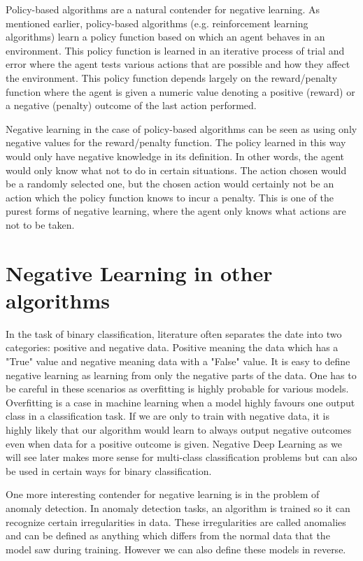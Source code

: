 \documentclass[b5paper]{book}
\begin{document}
Policy-based algorithms are a natural contender for negative learning. As mentioned earlier, policy-based algorithms (e.g. reinforcement learning algorithms) learn a policy function based on which an agent behaves in an environment. This policy function is learned in an iterative process of trial and error where the agent tests various actions that are possible and how they affect the environment. This policy function depends largely on the reward/penalty function where the agent is given a numeric value denoting a positive (reward) or a negative (penalty) outcome of the last action performed.

Negative learning in the case of policy-based algorithms can be seen as using only negative values for the reward/penalty function. The policy learned in this way would only have negative knowledge in its definition. In other words, the agent would only know what not to do in certain situations. The action chosen would be a randomly selected one, but the chosen action would certainly not be an action which the policy function knows to incur a penalty. This is one of the purest forms of negative learning, where the agent only knows what actions are not to be taken.

\section{Negative Learning in other algorithms}

In the task of binary classification, literature often separates the date into two categories: positive and negative data. Positive meaning the data which has a "True" value and negative meaning data with a "False" value. It is easy to define negative learning as learning from only the negative parts of the data. One has to be careful in these scenarios as overfitting is highly probable for various models. Overfitting is a case in machine learning when a model highly favours one output class in a classification task. If we are only to train with negative data, it is highly likely that our algorithm would learn to always output negative outcomes even when data for a positive outcome is given. Negative Deep Learning as we will see later makes more sense for multi-class classification problems but can also be used in certain ways for binary classification.

One more interesting contender for negative learning is in the problem of anomaly detection. In anomaly detection tasks, an algorithm is trained so it can recognize certain irregularities in data. These irregularities are called anomalies and can be defined as anything which differs from the normal data that the model saw during training. However we can also define these models in reverse. 
\end{document}

